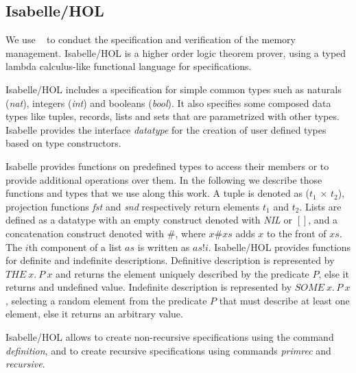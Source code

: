 \subsection{Isabelle/HOL}
We use ~\cite{reg_Isabelle/HOL} to conduct the specification and verification of the memory management. Isabelle/HOL is a higher order logic theorem prover, using a typed lambda calculus-like functional language for specifications.

Isabelle/HOL includes a specification for simple common types such as naturals (\emph{nat}), integers (\emph{int}) and booleans (\emph{bool}). It also specifies some composed data types like tuples, records, lists and sets that are parametrized with other types. Isabelle provides the interface \emph{datatype} for the creation of user defined types based on type constructors. 

Isabelle provides functions on predefined types to access their members or to provide additional operations over them. In the following we describe those functions and types that we use along this work. A tuple is denoted as (\emph{$t_1$} $\times$ \emph{$t_2$}), projection functions \emph{fst} and \emph{snd} respectively return elements $t_1$ and $t_2$. Lists are defined as a datatype with an empty construct denoted with \emph{NIL} or $[]$, and a concatenation construct denoted with $\#$, where $x\#xs$ adds $x$ to the front of $xs$. The $i$th component of a list $as$ is written as $as!i$. Isabelle/HOL provides functions for definite and indefinite descriptions. Definitive description is represented by $THE\ x.\ P\ x$ and returns the element uniquely described by the predicate $P$, else it returns and undefined value. Indefinite description is represented by $SOME\ x.\, P\ x$, selecting a random element from the predicate $P$ that must describe at least one element, else it returns an arbitrary value.

Isabelle/HOL allows  to create non-recursive specifications using the command \emph{definition}, and to create recursive specifications using commands \emph{primrec} and \emph{recursive}.
